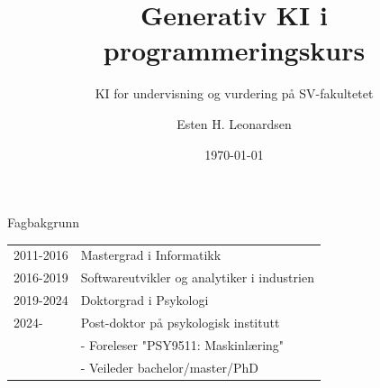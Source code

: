 \documentclass{beamer}
\title{Generativ KI i programmeringskurs}
\subtitle{KI for undervisning og vurdering på SV-fakultetet}
\author{Esten H. Leonardsen}
\date{\today}
\begin{document}
	\begin{frame}
	 	\titlepage
	\end{frame}

	\begin{frame}{Fagbakgrunn}
		\begin{tabular}{l l}
			\textbullet\hspace{0.1cm}2011-2016&Mastergrad i Informatikk\\
			\textbullet\hspace{0.1cm}2016-2019&Softwareutvikler og analytiker i industrien\\
			\textbullet\hspace{0.1cm}2019-2024&Doktorgrad i Psykologi\\
			\textbullet\hspace{0.1cm}2024-&Post-doktor på psykologisk institutt\\
			&\small{- Foreleser "PSY9511: Maskinlæring"}\\
			&\small{- Veileder bachelor/master/PhD}\\
		\end{tabular}
	\end{frame}
\end{document}
